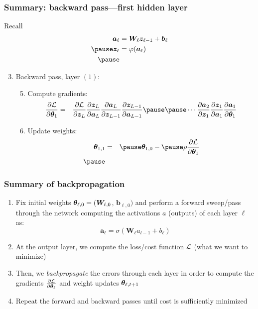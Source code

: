 \documentclass[smaller]{beamer}
\begin{document}
\begin{frame}
  \frametitle{Summary: backward pass---first hidden layer}
 \pe
  Recall
  \pe
  \begin{align}
      \bm a_{\ell} &=  \bm W_{\ell} \bm z_{\ell-1} + \bm b_{\ell} \\\pe
    \bm z_{\ell} &= \varphi(\bm a_{\ell}) \\\pe
  \end{align}

  \begin{enumerate}[<+->]\setcounter{enumi}{2}
  \item Backward pass, layer $(1)$:\pause
        \begin{enumerate}[<+->] \setcounter{enumii}{4}
    \item Compute gradients: \pause
    \begin{eqnarray}
      \pd{\mc{L}}{\bm\th_{1}} &=&  \pd{\mc{L}}{\bm z_{L}}\pd{\bm z_{L}}{\bm a_{L}}\pd{\bm a_{L}}{\bm z_{L-1}}
    \pd{\bm z_{L-1}}{\bm a_{L-1}}  \pause
                          \pause\cdots  
                          \pd{\bm a_{2}}{\bm z_{1}}                          
                        \pd{\bm z_{1}}{\bm a_{1}}\pd{\bm a_{1}}{\bm\th_{1}}
    \end{eqnarray}
    \pause
  \item Update weights: \pause
    \begin{eqnarray}
      \bm\th_{1, 1}  &=& \pause  \bm\th_{1,0} - \pause \rho \pd{\mc{L}}{\bm\th_{1}}  \\\pause
     \end{eqnarray}
  \end{enumerate}
  \end{enumerate}
\end{frame}


\begin{frame}
  \frametitle{Summary of backpropagation}\pause

  \begin{enumerate}[<+->]
  \item Fix initial weights $\bm{\theta}_{\ell,0} = (\bm W_{\ell,0}$, $\bm b_{\ell,0})$ and perform a forward sweep/pass through the network computing the activations $a$ (outputs) of each layer $\ell$ as:\pause
    \begin{equation}
      \bm a_{\ell} = \sigma(\bm W_{\ell} a_{l-1} + b_{\ell})
    \end{equation}
  \item At the output layer, we compute the loss/cost function $\mathcal L$ (what we want to minimize)
  \item Then, we {\it backpropagate} the errors through each layer in order to compute the gradients $\frac{\partial{\mathcal{L}}}{\partial{\bm{\theta}_{\ell}}}$ \pause
    and  weight updates  $\bm{\theta}_{\ell,t+1}$ 
\item Repeat the forward and backward passes until cost is sufficiently minimized
  \end{enumerate}
  
\end{frame}
\end{document}
